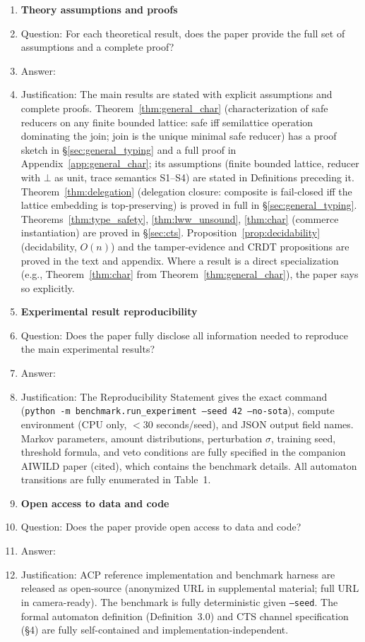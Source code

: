 \begin{enumerate}
\item {\bf Theory assumptions and proofs}
    \item[] Question: For each theoretical result, does the paper provide the full set of assumptions and a complete proof?
    \item[] Answer: \answerYes{}
    \item[] Justification: The main results are stated with explicit assumptions and complete proofs. Theorem~\ref{thm:general_char} (characterization of safe reducers on any finite bounded lattice: safe iff semilattice operation dominating the join; join is the unique minimal safe reducer) has a proof sketch in \S\ref{sec:general_typing} and a full proof in Appendix~\ref{app:general_char}; its assumptions (finite bounded lattice, reducer with $\bot$ as unit, trace semantics S1--S4) are stated in Definitions preceding it. Theorem~\ref{thm:delegation} (delegation closure: composite is fail-closed iff the lattice embedding is top-preserving) is proved in full in \S\ref{sec:general_typing}. Theorems~\ref{thm:type_safety}, \ref{thm:lww_unsound}, \ref{thm:char} (commerce instantiation) are proved in \S\ref{sec:cts}. Proposition~\ref{prop:decidability} (decidability, $O(n)$) and the tamper-evidence and CRDT propositions are proved in the text and appendix. Where a result is a direct specialization (e.g., Theorem~\ref{thm:char} from Theorem~\ref{thm:general_char}), the paper says so explicitly.

\item {\bf Experimental result reproducibility}
    \item[] Question: Does the paper fully disclose all information needed to reproduce the main experimental results?
    \item[] Answer: \answerYes{}
    \item[] Justification: The Reproducibility Statement gives the exact command (\texttt{python -m benchmark.run\_experiment --seed 42 --no-sota}), compute environment (CPU only, $<$30 seconds/seed), and JSON output field names. Markov parameters, amount distributions, perturbation $\sigma$, training seed, threshold formula, and veto conditions are fully specified in the companion AIWILD paper (cited), which contains the benchmark details. All automaton transitions are fully enumerated in Table~1.

\item {\bf Open access to data and code}
    \item[] Question: Does the paper provide open access to data and code?
    \item[] Answer: \answerYes{}
    \item[] Justification: ACP reference implementation and benchmark harness are released as open-source (anonymized URL in supplemental material; full URL in camera-ready). The benchmark is fully deterministic given \texttt{--seed}. The formal automaton definition (Definition~3.0) and CTS channel specification (\S4) are fully self-contained and implementation-independent.


\end{enumerate}
